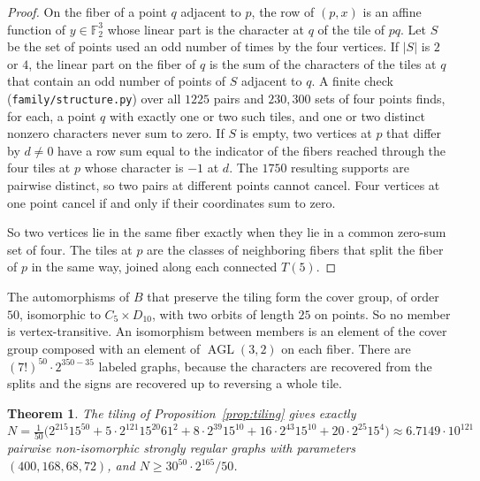 \documentclass[11pt]{amsart}
\newtheorem{theorem}{Theorem}[section]
\theoremstyle{remark}
\newcommand{\F}{\mathbb{F}}
\DeclareMathOperator{\AGL}{AGL}
\begin{document}
\begin{proof}
On the fiber of a point $q$ adjacent to $p$, the row of $(p,x)$ is an affine function of $y\in\F_2^3$ whose linear part is the character at $q$ of the tile of $pq$. Let $S$ be the set of points used an odd number of times by the four vertices. If $|S|$ is $2$ or $4$, the linear part on the fiber of $q$ is the sum of the characters of the tiles at $q$ that contain an odd number of points of $S$ adjacent to $q$. A finite check (\texttt{family/structure.py}) over all $1225$ pairs and $230{,}300$ sets of four points finds, for each, a point $q$ with exactly one or two such tiles, and one or two distinct nonzero characters never sum to zero. If $S$ is empty, two vertices at $p$ that differ by $d\ne0$ have a row sum equal to the indicator of the fibers reached through the four tiles at $p$ whose character is $-1$ at $d$. The $1750$ resulting supports are pairwise distinct, so two pairs at different points cannot cancel. Four vertices at one point cancel if and only if their coordinates sum to zero.

So two vertices lie in the same fiber exactly when they lie in a common zero-sum set of four. The tiles at $p$ are the classes of neighboring fibers that split the fiber of $p$ in the same way, joined along each connected $T(5)$.
\end{proof}

The automorphisms of $B$ that preserve the tiling form the cover group, of order $50$, isomorphic to $C_5\times D_{10}$, with two orbits of length $25$ on points. So no member is vertex-transitive. An isomorphism between members is an element of the cover group composed with an element of $\AGL(3,2)$ on each fiber. There are $(7!)^{50}\cdot2^{350-35}$ labeled graphs, because the characters are recovered from the splits and the signs are recovered up to reversing a whole tile.

\begin{theorem}\label{thm:count}
The tiling of Proposition~\ref{prop:tiling} gives exactly
\[
N=\tfrac1{50}\bigl(2^{215}15^{50}+5\cdot2^{121}15^{20}61^2+8\cdot2^{39}15^{10}+16\cdot2^{43}15^{10}+20\cdot2^{25}15^{4}\bigr)\approx6.7149\cdot10^{121}
\]
pairwise non-isomorphic strongly regular graphs with parameters $(400,168,68,72)$, and $N\ge30^{50}\cdot2^{165}/50$.
\end{theorem}
\end{document}
